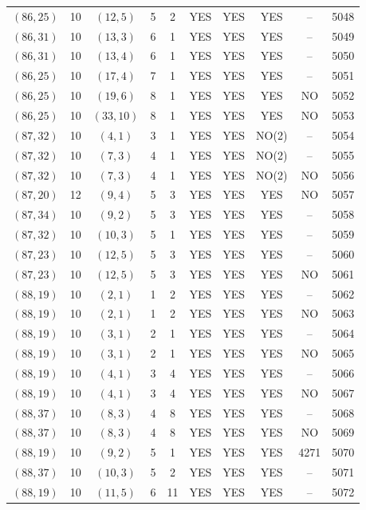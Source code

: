 \begin{longtable}{|c|c|c|c|c|c|c|c|c|c|}
$(86, 25)$ & 10 & $(12, 5)$ & 5 & 2 & YES & YES & YES & -- & 5048\\
$(86, 31)$ & 10 & $(13, 3)$ & 6 & 1 & YES & YES & YES & -- & 5049\\
$(86, 31)$ & 10 & $(13, 4)$ & 6 & 1 & YES & YES & YES & -- & 5050\\
$(86, 25)$ & 10 & $(17, 4)$ & 7 & 1 & YES & YES & YES & -- & 5051\\
$(86, 25)$ & 10 & $(19, 6)$ & 8 & 1 & YES & YES & YES & NO & 5052\\
$(86, 25)$ & 10 & $(33, 10)$ & 8 & 1 & YES & YES & YES & NO & 5053\\
$(87, 32)$ & 10 & $(4, 1)$ & 3 & 1 & YES & YES & NO(2) & -- & 5054\\
$(87, 32)$ & 10 & $(7, 3)$ & 4 & 1 & YES & YES & NO(2) & -- & 5055\\
$(87, 32)$ & 10 & $(7, 3)$ & 4 & 1 & YES & YES & NO(2) & NO & 5056\\
$(87, 20)$ & 12 & $(9, 4)$ & 5 & 3 & YES & YES & YES & NO & 5057\\
$(87, 34)$ & 10 & $(9, 2)$ & 5 & 3 & YES & YES & YES & -- & 5058\\
$(87, 32)$ & 10 & $(10, 3)$ & 5 & 1 & YES & YES & YES & -- & 5059\\
$(87, 23)$ & 10 & $(12, 5)$ & 5 & 3 & YES & YES & YES & -- & 5060\\
$(87, 23)$ & 10 & $(12, 5)$ & 5 & 3 & YES & YES & YES & NO & 5061\\
$(88, 19)$ & 10 & $(2, 1)$ & 1 & 2 & YES & YES & YES & -- & 5062\\
$(88, 19)$ & 10 & $(2, 1)$ & 1 & 2 & YES & YES & YES & NO & 5063\\
$(88, 19)$ & 10 & $(3, 1)$ & 2 & 1 & YES & YES & YES & -- & 5064\\
$(88, 19)$ & 10 & $(3, 1)$ & 2 & 1 & YES & YES & YES & NO & 5065\\
$(88, 19)$ & 10 & $(4, 1)$ & 3 & 4 & YES & YES & YES & -- & 5066\\
$(88, 19)$ & 10 & $(4, 1)$ & 3 & 4 & YES & YES & YES & NO & 5067\\
$(88, 37)$ & 10 & $(8, 3)$ & 4 & 8 & YES & YES & YES & -- & 5068\\
$(88, 37)$ & 10 & $(8, 3)$ & 4 & 8 & YES & YES & YES & NO & 5069\\
$(88, 19)$ & 10 & $(9, 2)$ & 5 & 1 & YES & YES & YES & 4271 & 5070\\
$(88, 37)$ & 10 & $(10, 3)$ & 5 & 2 & YES & YES & YES & -- & 5071\\
$(88, 19)$ & 10 & $(11, 5)$ & 6 & 11 & YES & YES & YES & -- & 5072\\

\end{longtable}
